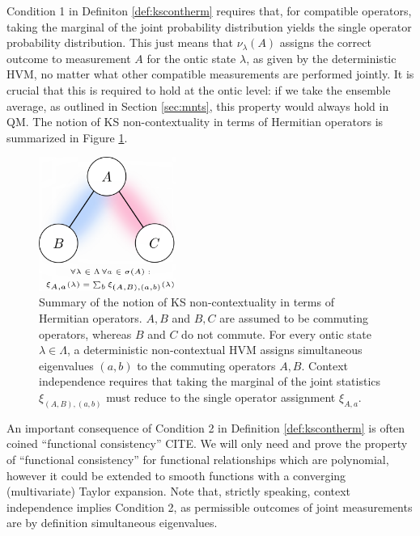 Condition 1 in Definiton \ref{def:kscontherm} requires that, for compatible operators, taking the marginal of the joint probability distribution yields the single operator probability distribution. This just means that $\nu_\lambda(A)$ assigns the correct outcome to measurement $A$ for the ontic state $\lambda$, as given by the deterministic HVM, no matter what other compatible measurements are performed jointly. It is crucial that this is required to hold at the ontic level: if we take the ensemble average, as outlined in Section \ref{sec:mnts}, this property would always hold in QM. The notion of KS non-contextuality in terms of Hermitian operators is summarized in Figure \ref{fig:trianglegraph}.

\begin{figure}
    \centering
    \includegraphics[width=0.4\textwidth]{images/trianglegraph.png}
    \caption{Summary of the notion of KS non-contextuality in terms of Hermitian operators. $A,B$ and $B,C$ are assumed to be commuting operators, whereas $B$ and $C$ do not commute. For every ontic state $\lambda\in\Lambda$, a deterministic non-contextual HVM assigns simultaneous eigenvalues $(a,b)$ to the commuting operators ${A,B}$. Context independence requires that taking the marginal of the joint statistics $\xi_{(A,B),(a,b)}$ must reduce to the single operator assignment $\xi_{A,a}$.}
    \label{fig:trianglegraph}
\end{figure}

An important consequence of Condition 2 in Definition \ref{def:kscontherm} is often coined “functional consistency” CITE. We will only need and prove the property of “functional consistency” for functional relationships which are polynomial, however it could be extended to smooth functions with a converging (multivariate) Taylor expansion. Note that, strictly speaking, context independence implies Condition 2, as permissible outcomes of joint measurements are by definition simultaneous eigenvalues.

